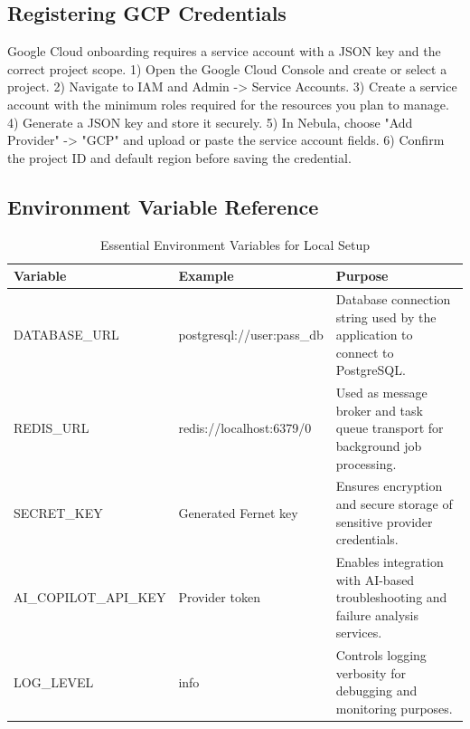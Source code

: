 \subsection{Registering GCP Credentials}
Google Cloud onboarding requires a service account with a JSON key and the correct project scope.
1) Open the Google Cloud Console and create or select a project.
2) Navigate to IAM and Admin -> Service Accounts.
3) Create a service account with the minimum roles required for the resources you plan to manage.
4) Generate a JSON key and store it securely.
5) In Nebula, choose "Add Provider" -> "GCP" and upload or paste the service account fields.
6) Confirm the project ID and default region before saving the credential.

\subsection{Environment Variable Reference}
\begin{table}[H]
\centering
\caption{Essential Environment Variables for Local Setup}
\label{tab:appendix_env_vars}

\renewcommand{\arraystretch}{1.6}

\begin{tabular}{|p{5cm}|p{5cm}|p{6cm}|}
\hline
\textbf{Variable} & \textbf{Example} & \textbf{Purpose} \\ \hline

DATABASE\_URL & postgresql://user:pass\_db & Database connection string used by the application to connect to PostgreSQL. \\ \hline

REDIS\_URL & redis://localhost:6379/0 & Used as message broker and task queue transport for background job processing. \\ \hline

SECRET\_KEY & Generated Fernet key & Ensures encryption and secure storage of sensitive provider credentials. \\ \hline

AI\_COPILOT\_API\_KEY & Provider token & Enables integration with AI-based troubleshooting and failure analysis services. \\ \hline

LOG\_LEVEL & info & Controls logging verbosity for debugging and monitoring purposes. \\ \hline

\end{tabular}
\end{table}

